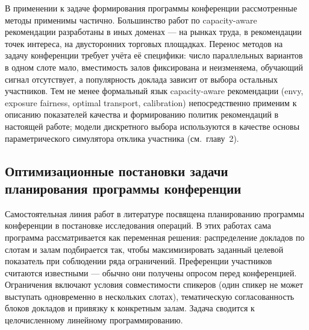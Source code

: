 В применении к задаче формирования программы конференции рассмотренные методы применимы частично. Большинство работ по capacity-aware рекомендации разработаны в иных доменах --- на рынках труда, в рекомендации точек интереса, на двусторонних торговых площадках. Перенос методов на задачу конференции требует учёта её специфики: число параллельных вариантов в одном слоте мало, вместимость залов фиксирована и неизменяема, обучающий сигнал отсутствует, а популярность доклада зависит от выбора остальных участников. Тем не менее формальный язык capacity-aware рекомендации (envy, exposure fairness, optimal transport, calibration) непосредственно применим к описанию показателей качества и формированию политик рекомендаций в настоящей работе; модели дискретного выбора используются в качестве основы параметрического симулятора отклика участника (см.~главу~2).


\subsection{Оптимизационные постановки задачи планирования программы конференции}

Самостоятельная линия работ в литературе посвящена планированию программы конференции в постановке исследования операций. В этих работах сама программа рассматривается как переменная решения: распределение докладов по слотам и залам подбирается так, чтобы максимизировать заданный целевой показатель при соблюдении ряда ограничений. Преференции участников считаются известными --- обычно они получены опросом перед конференцией. Ограничения включают условия совместимости спикеров (один спикер не может выступать одновременно в нескольких слотах), тематическую согласованность блоков докладов и привязку к конкретным залам. Задача сводится к целочисленному линейному программированию.

